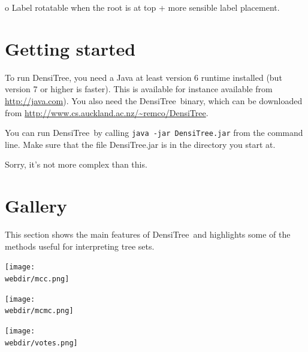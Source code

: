 \documentclass{article}
\def\DensiTree{DensiTree}
\def\webdir{/home/remco/research/DensiTree/web}
\begin{document}
o Label rotatable when the root is at top + more sensible label placement.

\newpage
\section{Getting started\label{sec.start}}

To run \DensiTree, you need a Java at least version 6 runtime installed (but version 7 or higher is faster). This is available for instance available from \url{http://java.com}). You also need the \DensiTree\ binary,
which can be downloaded from \url{http://www.cs.auckland.ac.nz/~remco/DensiTree}.

You can run \DensiTree\ by calling {\tt java -jar DensiTree.jar} from the command line. Make sure that the file DensiTree.jar is in the directory you start at.

Sorry, it's not more complex than this.

\newpage
\section{Gallery\label{sec.gal}}

This section shows the main features of \DensiTree\ and highlights some of the
methods useful for interpreting tree sets.

\begin{center}
\texttt{[image: \\webdir/mcc.png]}
\end{center}

\newpage
\begin{center}
\texttt{[image: \\webdir/mcmc.png]}
\end{center}

\newpage
\begin{center}
\texttt{[image: \\webdir/votes.png]}
\end{center}
\end{document}

